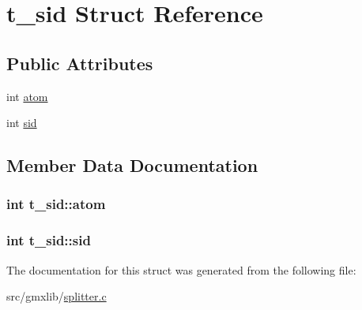 \hypertarget{structt__sid}{\section{t\-\_\-sid \-Struct \-Reference}
\label{structt__sid}
}
\subsection*{\-Public \-Attributes}
\begin{DoxyCompactItemize}
\item 
int \hyperlink{structt__sid_a091e57c7d73920d319fe561d013f3dbc}{atom}
\item 
int \hyperlink{structt__sid_ae5dd2bee4f86e4591603ab82c87a6c76}{sid}
\end{DoxyCompactItemize}


\subsection{\-Member \-Data \-Documentation}
\hypertarget{structt__sid_a091e57c7d73920d319fe561d013f3dbc}{
\subsubsection[{atom}]{\setlength{\rightskip}{0pt plus 5cm}int {\bf t\-\_\-sid\-::atom}}}\label{structt__sid_a091e57c7d73920d319fe561d013f3dbc}
\hypertarget{structt__sid_ae5dd2bee4f86e4591603ab82c87a6c76}{
\subsubsection[{sid}]{\setlength{\rightskip}{0pt plus 5cm}int {\bf t\-\_\-sid\-::sid}}}\label{structt__sid_ae5dd2bee4f86e4591603ab82c87a6c76}


\-The documentation for this struct was generated from the following file\-:\begin{DoxyCompactItemize}
\item 
src/gmxlib/\hyperlink{splitter_8c}{splitter.\-c}\end{DoxyCompactItemize}
